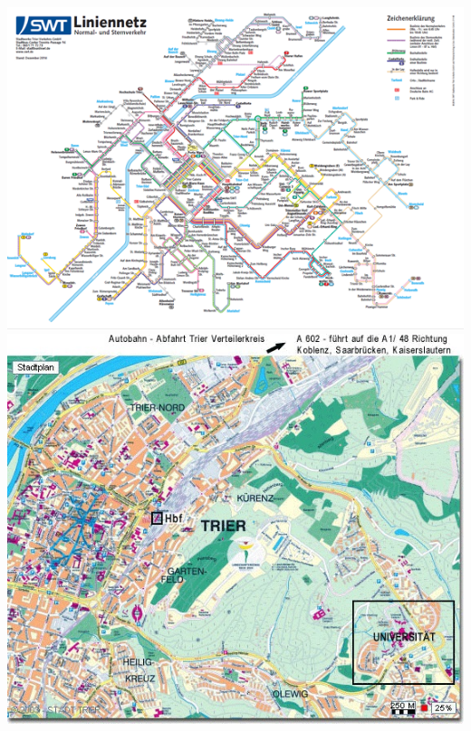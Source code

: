 
\begin{frame}
	
	\begin{columns}
			\includegraphics[scale=0.3]{./pictures/liniennetz.png}
			\includegraphics[scale=0.4]{./pictures/stadtplan_02.jpg}
	\end{columns}
\end{frame}



